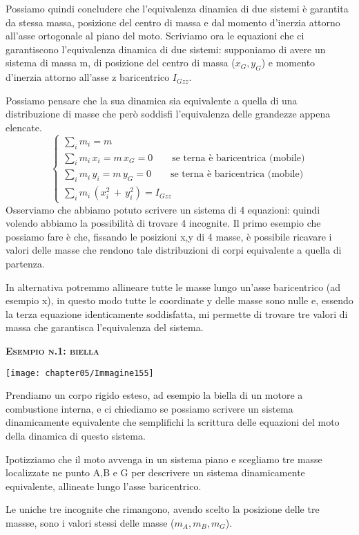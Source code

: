 Possiamo quindi concludere che l'equivalenza dinamica di due sistemi è garantita da stessa massa, posizione del centro di massa e dal momento d'inerzia attorno all'asse ortogonale al piano del moto. Scriviamo ora le equazioni che ci garantiscono l'equivalenza dinamica di due sistemi: supponiamo di avere un sistema di massa m, di posizione del centro di massa ($x_G, y_G$) e momento d'inerzia attorno all'asse z baricentrico $I_{Gzz}$.

Possiamo pensare che la sua dinamica sia equivalente a quella di una distribuzione di masse che però soddisfi l'equivalenza delle grandezze appena elencate.
\[
\begin{cases}
\sum_i m_i = m\\
\sum_i m_i\,x_i = m\,x_G = 0 \qquad\text{se terna è baricentrica (mobile)}\\
\sum_i m_i\,y_i = m\,y_G = 0 \qquad\text{se terna è baricentrica (mobile)}\\
\sum_i m_i\,(x_i^2\,+\,y_i^2) = I_{Gzz}
\end{cases}
\]
Osserviamo che abbiamo potuto scrivere un sistema di 4 equazioni: quindi volendo abbiamo la possibilità di trovare 4 incognite. Il primo esempio che possiamo fare è che, fissando le posizioni x,y di 4 masse, è possibile ricavare i valori delle masse che rendono tale distribuzioni di corpi equivalente a quella di partenza.

In alternativa potremmo allineare tutte le masse lungo un'asse baricentrico (ad esempio x), in questo modo tutte le coordinate y delle masse sono nulle e, essendo la terza equazione identicamente soddisfatta, mi permette di trovare tre valori di massa che garantisca l'equivalenza del sistema.

\begin{center}
{\scshape{\bfseries Esempio n.1: biella}}
\end{center}

\begin{minipage}{.5\textwidth}
\centering
\texttt{[image: chapter05/Immagine155]}
\end{minipage}
\hfill
\begin{minipage}{.5\textwidth}
Prendiamo un corpo rigido esteso, ad esempio la biella di un motore a combustione interna, e ci chiediamo se possiamo scrivere un sistema dinamicamente equivalente che semplifichi la scrittura delle equazioni del moto della dinamica di questo sistema.

Ipotizziamo che il moto avvenga in un sistema piano e scegliamo tre masse localizzate ne punto A,B e G per descrivere un sistema dinamicamente equivalente, allineate lungo l'asse baricentrico.

Le uniche tre incognite che rimangono, avendo scelto la posizione delle tre massse, sono i valori stessi delle masse ($m_A, m_B, m_G$).
\end{minipage}

